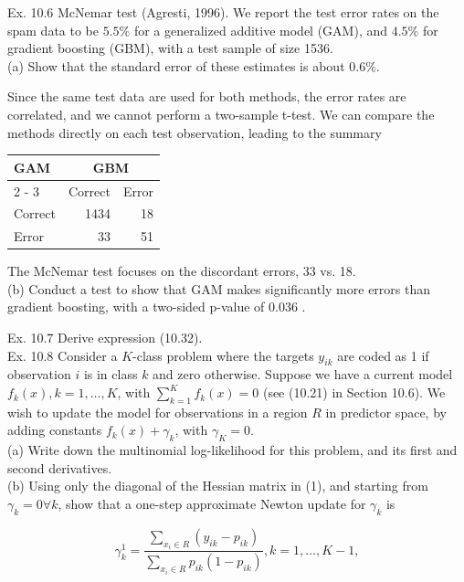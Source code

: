 \documentclass[10pt]{article}
\begin{document}
Ex. 10.6 McNemar test (Agresti, 1996). We report the test error rates on the spam data to be $5.5 \%$ for a generalized additive model (GAM), and $4.5 \%$ for gradient boosting (GBM), with a test sample of size 1536.\\
(a) Show that the standard error of these estimates is about $0.6 \%$.

Since the same test data are used for both methods, the error rates are correlated, and we cannot perform a two-sample t-test. We can compare the methods directly on each test observation, leading to the summary

\begin{center}
\begin{tabular}{l|rr}
\hline
\multirow{2}{*}{GAM} & \multicolumn{2}{|c}{GBM} \\
\cline { 2 - 3 }
 & Correct & Error \\
\hline
Correct & 1434 & 18 \\
Error & 33 & 51 \\
\hline
\end{tabular}
\end{center}

The McNemar test focuses on the discordant errors, 33 vs. 18.\\
(b) Conduct a test to show that GAM makes significantly more errors than gradient boosting, with a two-sided p-value of 0.036 .

Ex. 10.7 Derive expression (10.32).\\
Ex. 10.8 Consider a $K$-class problem where the targets $y_{i k}$ are coded as 1 if observation $i$ is in class $k$ and zero otherwise. Suppose we have a current model $f_{k}(x), k=1, \ldots, K$, with $\sum_{k=1}^{K} f_{k}(x)=0$ (see (10.21) in Section 10.6). We wish to update the model for observations in a region $R$ in predictor space, by adding constants $f_{k}(x)+\gamma_{k}$, with $\gamma_{K}=0$.\\
(a) Write down the multinomial log-likelihood for this problem, and its first and second derivatives.\\
(b) Using only the diagonal of the Hessian matrix in (1), and starting from $\gamma_{k}=0 \forall k$, show that a one-step approximate Newton update for $\gamma_{k}$ is


\begin{equation*}
\gamma_{k}^{1}=\frac{\sum_{x_{i} \in R}\left(y_{i k}-p_{i k}\right)}{\sum_{x_{i} \in R} p_{i k}\left(1-p_{i k}\right)}, k=1, \ldots, K-1, \tag{10.57}
\end{equation*}
\end{document}
